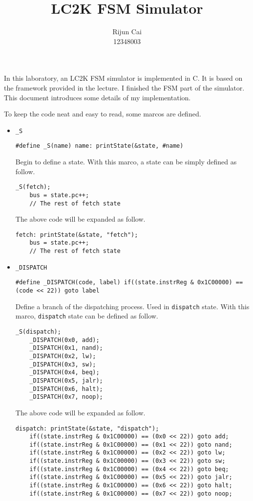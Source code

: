 \documentclass[a4paper]{article}
\title{LC2K FSM Simulator}
\author{Rijun Cai\\12348003}
\begin{document}
\maketitle

In this laboratory, an LC2K FSM simulator is implemented in C. It is based on the framework provided
in the lecture. I finished the FSM part of the simulator. This document introduces some details of
my implementation.

To keep the code neat and easy to read, some marcos are defined.

\begin{itemize}
    \item \verb|_S|

        \begin{verbatim}
#define _S(name) name: printState(&state, #name)
        \end{verbatim}
        Begin to define a state. With this marco, a state can be simply defined as follow.
        \begin{verbatim}
_S(fetch);
    bus = state.pc++;
    // The rest of fetch state
        \end{verbatim}
        The above code will be expanded as follow.
        \begin{verbatim}
fetch: printState(&state, "fetch");
    bus = state.pc++;
    // The rest of fetch state
        \end{verbatim}


    \item \verb|_DISPATCH|

        \begin{verbatim}
#define _DISPATCH(code, label) if((state.instrReg & 0x1C00000) == (code << 22)) goto label
        \end{verbatim}

        Define a branch of the dispatching process. Used in \verb|dispatch| state. With this marco,
        \verb|dispatch| state can be defined as follow.
        \begin{verbatim}
_S(dispatch);
    _DISPATCH(0x0, add);
    _DISPATCH(0x1, nand);
    _DISPATCH(0x2, lw);
    _DISPATCH(0x3, sw);
    _DISPATCH(0x4, beq);
    _DISPATCH(0x5, jalr);
    _DISPATCH(0x6, halt);
    _DISPATCH(0x7, noop);
        \end{verbatim}
        The above code will be expanded as follow.
        \begin{verbatim}
dispatch: printState(&state, "dispatch");
    if((state.instrReg & 0x1C00000) == (0x0 << 22)) goto add;
    if((state.instrReg & 0x1C00000) == (0x1 << 22)) goto nand;
    if((state.instrReg & 0x1C00000) == (0x2 << 22)) goto lw;
    if((state.instrReg & 0x1C00000) == (0x3 << 22)) goto sw;
    if((state.instrReg & 0x1C00000) == (0x4 << 22)) goto beq;
    if((state.instrReg & 0x1C00000) == (0x5 << 22)) goto jalr;
    if((state.instrReg & 0x1C00000) == (0x6 << 22)) goto halt;
    if((state.instrReg & 0x1C00000) == (0x7 << 22)) goto noop;
        \end{verbatim}



\end{itemize}
\end{document}
